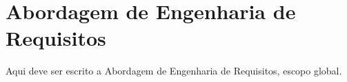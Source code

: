 \chapter[Abordagem de Engenharia de Requisitos]{Abordagem de Engenharia de Requisitos}
Aqui deve ser escrito a Abordagem de Engenharia de Requisitos, escopo global.
